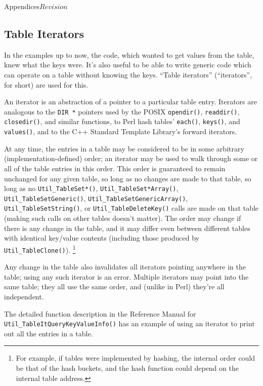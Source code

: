 \begin{cactuspart}{Appendices}{}{$Revision$}

\subsection{Table Iterators}
\label{sect-UtilityRoutines/tables/table-iterators}

In the examples up to now, the code, which wanted to get values from
the table, knew what the keys were.  It's also useful to be able to
write generic code which can operate on a table without knowing the
keys.  ``Table iterators'' (``iterators'', for short) are used for this.

An iterator is an abstraction of a pointer to a particular table entry.
Iterators are analogous to the \verb|DIR *| pointers used by the POSIX
\verb|opendir()|, \verb|readdir()|, \verb|closedir()|, and similar
functions, to Perl hash tables' \verb|each()|, \verb|keys()|,
and \verb|values()|, and to the C++ Standard Template Library's
forward iterators.

At any time, the entries in a table may be considered to be in some
arbitrary (implementation-defined) order; an iterator may be used to
walk through some or all of the table entries in this order.  This
order is guaranteed to remain unchanged for any given table, so long
as no changes are made to that table, \ie{} so long as no
\verb|Util_TableSet*()|, \verb|Util_TableSet*Array()|,
\verb|Util_TableSetGeneric()|, \verb|Util_TableSetGenericArray()|,
\verb|Util_TableSetString()|, or \verb|Util_TableDeleteKey()| calls
are made on that table (making such calls on other tables doesn't
matter).  The order may change if there is any change in the table,
and it may differ even between different tables with identical key/value
contents (including those produced by \verb|Util_TableClone()|).%
\footnote{%
	 For example, if tables were implemented by hashing,
	 the internal order could be that of the hash buckets,
	 and the hash function could depend on the internal
	 table address.
	 }%
{}

Any change in the table also invalidates all iterators pointing
anywhere in the table; using any such iterator is an error.
Multiple iterators may point into the same table; they all use the
same order, and (unlike in Perl) they're all independent.

The detailed function description
in the Reference Manual
for \verb|Util_TableItQueryKeyValueInfo()| has an example of
using an iterator to print out all the entries in a table.


\end{cactuspart}
